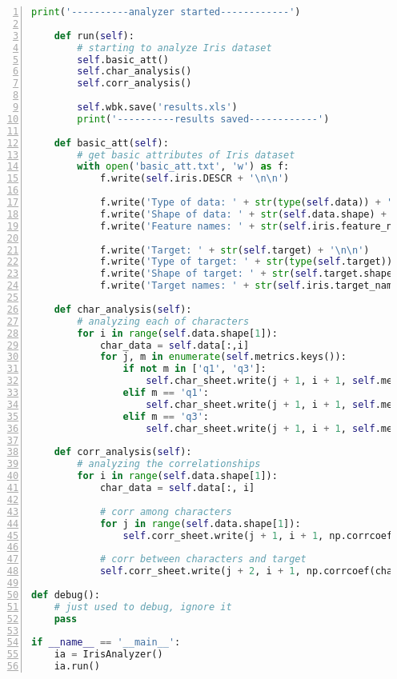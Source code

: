 \documentclass[12pt,a4paper]{article}
\theoremstyle{definition}
\begin{document}
\begin{appendix}
\begin{lstlisting}[numbers=left, language=Python, frame=shadowbox, breaklines=True, title=Iris数据集探索代码]
        print('----------analyzer started------------')

    def run(self):
        # starting to analyze Iris dataset
        self.basic_att()
        self.char_analysis()
        self.corr_analysis()

        self.wbk.save('results.xls')
        print('----------results saved------------')

    def basic_att(self):
        # get basic attributes of Iris dataset
        with open('basic_att.txt', 'w') as f:
            f.write(self.iris.DESCR + '\n\n')

            f.write('Type of data: ' + str(type(self.data)) + '\n\n')
            f.write('Shape of data: ' + str(self.data.shape) + '\n\n')
            f.write('Feature names: ' + str(self.iris.feature_names) + '\n\n')

            f.write('Target: ' + str(self.target) + '\n\n')
            f.write('Type of target: ' + str(type(self.target)) + '\n\n')
            f.write('Shape of target: ' + str(self.target.shape) + '\n\n')
            f.write('Target names: ' + str(self.iris.target_names) + '\n\n')

    def char_analysis(self):
        # analyzing each of characters
        for i in range(self.data.shape[1]):
            char_data = self.data[:,i]
            for j, m in enumerate(self.metrics.keys()):
                if not m in ['q1', 'q3']:
                    self.char_sheet.write(j + 1, i + 1, self.metrics[m](char_data))
                elif m == 'q1':
                    self.char_sheet.write(j + 1, i + 1, self.metrics[m](char_data, p=0.25))
                elif m == 'q3':
                    self.char_sheet.write(j + 1, i + 1, self.metrics[m](char_data, p=0.75))

    def corr_analysis(self):
        # analyzing the correlationships
        for i in range(self.data.shape[1]):
            char_data = self.data[:, i]

            # corr among characters
            for j in range(self.data.shape[1]):
                self.corr_sheet.write(j + 1, i + 1, np.corrcoef(char_data, self.data[:, j])[0][1])

            # corr between characters and target
            self.corr_sheet.write(j + 2, i + 1, np.corrcoef(char_data, self.target)[0][1])

def debug():
    # just used to debug, ignore it
    pass

if __name__ == '__main__':
    ia = IrisAnalyzer()
    ia.run()
		\end{lstlisting}
	
\end{appendix}

\end{document}
